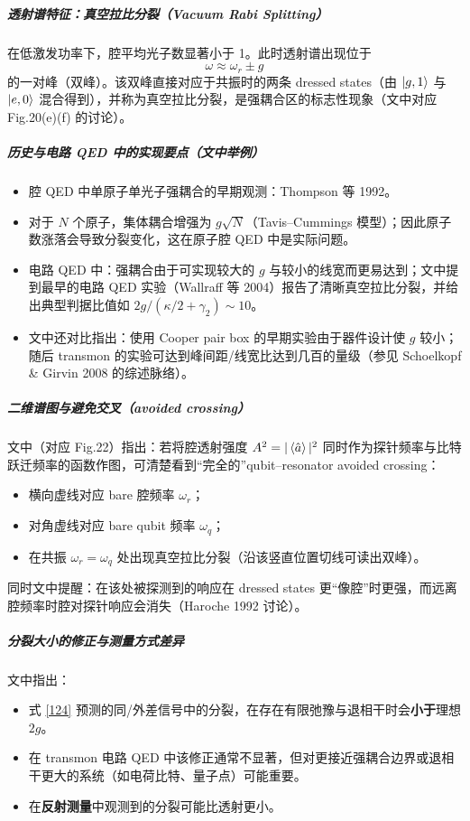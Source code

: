 \documentclass[12pt,a4paper,oneside]{ctexbook}
\let\oldsubparagraph\subparagraph
\renewcommand{\subparagraph}[1]{\oldsubparagraph{#1}\mbox{}}
\begin{document}
\subparagraph{透射谱特征：真空拉比分裂（Vacuum Rabi Splitting）}
在低激发功率下，腔平均光子数显著小于 1。此时透射谱出现位于
\[
\omega \approx \omega_r \pm g
\]
的一对峰（双峰）。该双峰直接对应于共振时的两条 dressed states（由 $\ket{g,1}$ 与 $\ket{e,0}$ 混合得到），并称为真空拉比分裂，是强耦合区的标志性现象（文中对应 Fig.20(e)(f) 的讨论）。

\subparagraph{历史与电路 QED 中的实现要点（文中举例）}
\begin{itemize}
\item 腔 QED 中单原子单光子强耦合的早期观测：Thompson 等 1992。
\item 对于 $N$ 个原子，集体耦合增强为 $g\sqrt{N}$（Tavis--Cummings 模型）；因此原子数涨落会导致分裂变化，这在原子腔 QED 中是实际问题。
\item 电路 QED 中：强耦合由于可实现较大的 $g$ 与较小的线宽而更易达到；文中提到最早的电路 QED 实验（Wallraff 等 2004）报告了清晰真空拉比分裂，并给出典型判据比值如 $2g/(\kappa/2+\gamma_2)\sim 10$。
\item 文中还对比指出：使用 Cooper pair box 的早期实验由于器件设计使 $g$ 较小；随后 transmon 的实验可达到峰间距/线宽比达到几百的量级（参见 Schoelkopf \& Girvin 2008 的综述脉络）。
\end{itemize}

\subparagraph{二维谱图与避免交叉（avoided crossing）}
文中（对应 Fig.22）指出：若将腔透射强度 $A^2=|\expval{\hat a}|^2$ 同时作为探针频率与比特跃迁频率的函数作图，可清楚看到“完全的”qubit--resonator avoided crossing：
\begin{itemize}
\item 横向虚线对应 bare 腔频率 $\omega_r$；
\item 对角虚线对应 bare qubit 频率 $\omega_q$；
\item 在共振 $\omega_r=\omega_q$ 处出现真空拉比分裂（沿该竖直位置切线可读出双峰）。
\end{itemize}
同时文中提醒：在该处被探测到的响应在 dressed states 更“像腔”时更强，而远离腔频率时腔对探针响应会消失（Haroche 1992 讨论）。

\subparagraph{分裂大小的修正与测量方式差异}
文中指出：
\begin{itemize}
\item 式 \eqref{124} 预测的同/外差信号中的分裂，在存在有限弛豫与退相干时会\textbf{小于}理想 $2g$。
\item 在 transmon 电路 QED 中该修正通常不显著，但对更接近强耦合边界或退相干更大的系统（如电荷比特、量子点）可能重要。
\item 在\textbf{反射测量}中观测到的分裂可能比透射更小。
\end{itemize}
\end{document}
